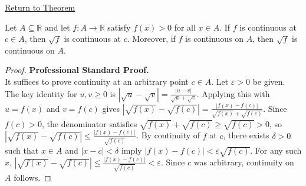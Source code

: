 \newpage
{}
\label{prf:square-root-preserves-continuity}

\begin{remark*}[Return]
\hyperref[thm:square-root-preserves-continuity]{Return to Theorem}
\end{remark*}

\begin{theorem*}
Let $A \subseteq \mathbb{R}$ and let $f \colon A \to \mathbb{R}$ satisfy $f(x) > 0$ for all $x \in A$. If $f$ is continuous at $c \in A$, then $\sqrt{f}$ is continuous at $c$. Moreover, if $f$ is continuous on $A$, then $\sqrt{f}$ is continuous on $A$.
\end{theorem*}

\begin{proof}
\textbf{Professional Standard Proof.}~\\
It suffices to prove continuity at an arbitrary point $c \in A$. Let $\varepsilon > 0$ be given. The key identity for $u, v \geq 0$ is $|\sqrt{u} - \sqrt{v}| = \frac{|u - v|}{\sqrt{u} + \sqrt{v}}$. Applying this with $u = f(x)$ and $v = f(c)$ gives $|\sqrt{f(x)} - \sqrt{f(c)}| = \frac{|f(x) - f(c)|}{\sqrt{f(x)} + \sqrt{f(c)}}$. Since $f(c) > 0$, the denominator satisfies $\sqrt{f(x)} + \sqrt{f(c)} \geq \sqrt{f(c)} > 0$, so $|\sqrt{f(x)} - \sqrt{f(c)}| \leq \frac{|f(x) - f(c)|}{\sqrt{f(c)}}$. By continuity of $f$ at $c$, there exists $\delta > 0$ such that $x \in A$ and $|x - c| < \delta$ imply $|f(x) - f(c)| < \varepsilon\sqrt{f(c)}$. For any such $x$, $|\sqrt{f(x)} - \sqrt{f(c)}| \leq \frac{|f(x) - f(c)|}{\sqrt{f(c)}} < \varepsilon$. Since $c$ was arbitrary, continuity on $A$ follows.
\end{proof}

